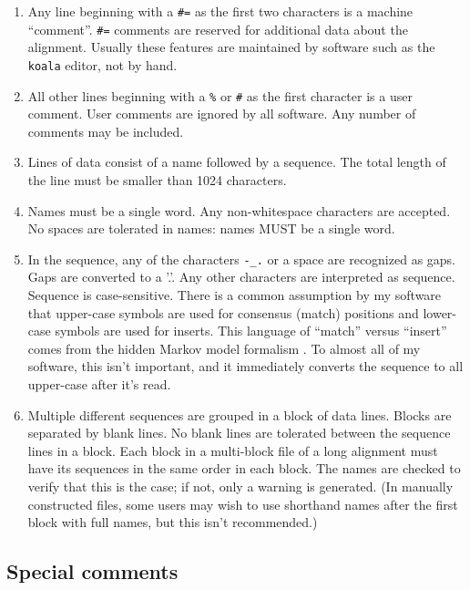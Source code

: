 \begin{enumerate}
\item
Any line beginning with a \verb+#=+ as the first two characters is a
machine ``comment''.  \verb+#=+ comments are reserved for additional
data about the alignment. Usually these features are maintained by
software such as the {\tt koala} editor, not by hand.

\item
All other lines beginning with a \verb+%+ or \verb+#+ as the first
character is a user comment.  User comments are ignored by all
software. Any number of comments may be included.

\item
Lines of data consist of a name followed by a sequence. The total
length of the line must be smaller than 1024 characters.

\item
Names must be a single word. Any non-whitespace characters are
accepted.  No spaces are tolerated in names: names MUST be a
single word.

\item
In the sequence, any of the characters \verb+-_.+ or a space are
recognized as gaps. Gaps are converted to a '.'. Any other characters
are interpreted as sequence.  Sequence is case-sensitive. There is a
common assumption by my software that upper-case symbols are used for
consensus (match) positions and lower-case symbols are used for
inserts. This language of ``match'' versus ``insert'' comes from the
hidden Markov model formalism \cite{Krogh94}. To almost all of my
software, this isn't important, and it immediately converts the
sequence to all upper-case after it's read.

\item
Multiple different sequences are grouped in a block of data lines.
Blocks are separated by blank lines. No blank lines are tolerated
between the sequence lines in a block. Each block in a multi-block
file of a long alignment must have its sequences in the same order in
each block. The names are checked to verify that this is the case; if
not, only a warning is generated. (In manually constructed files, some
users may wish to use shorthand names after the first block with full
names, but this isn't recommended.)
\end{enumerate}

\subsection {Special comments}

